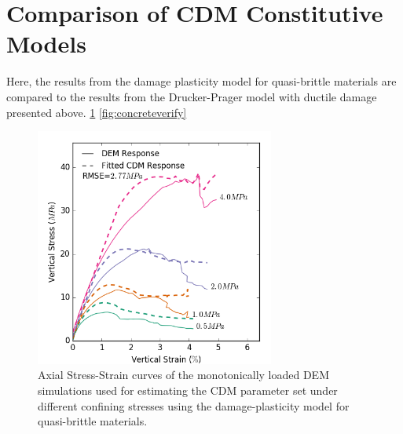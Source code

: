\section{Comparison of CDM Constitutive Models}

Here, the results from the damage plasticity model for quasi-brittle materials are compared to the results from the Drucker-Prager model with ductile damage presented above. 
\ref{fig:concretefitted}
\ref{fig:concreteverify}

\begin{figure}[!htb]
\begin{center}
\includegraphics[width=0.7\textwidth]{figures/Chapter5/ConcreteFittedCurves}
\caption{{\label{fig:concretefitted} Axial Stress-Strain curves of the monotonically loaded DEM simulations  used for estimating the CDM parameter set under different confining stresses using the damage-plasticity model for quasi-brittle materials.%
}}
\end{center}
\end{figure}


